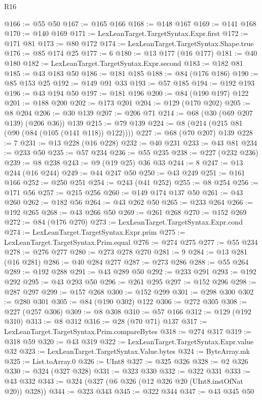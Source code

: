 \begin{lexlean}{R16}
\begin{coremodule}
@166 := @55 @50
@167 := @165 @166
@168 := @148 @167
@169 := @141 @168
@170 := @140 @169
@171 := LexLeanTarget.TargetSyntax.Expr.first
@172 := @171 @81
@173 := @80 @172
@174 := LexLeanTarget.TargetSyntax.Shape.true
@176 := @85 @174 @25
@177 := 6
@180 := @13 @177 (@16 @177)
@181 := @40 @180
@182 := LexLeanTarget.TargetSyntax.Expr.second
@183 := @182 @81
@185 := @43 @183 @50
@186 := @181 @185
@188 := @84 (@176 @186)
@190 := @85 @153 @25
@192 := @149 @91 @33
@193 := @57 @185
@194 := @192 @193
@196 := @43 @194 @50
@197 := @181 @196
@200 := @84 (@190 @197) @122
@201 := @188 @200
@202 := @173 @201
@204 := @129 (@170 @202)
@205 := @8 @204
@206 := @30 @139
@207 := @206 @71
@214 := @68 (@30 (@69 @207 @139) (@206 @36)) @139
@215 := @79 @139
@224 := @8 (@214 (@215 @81 (@90 (@84 (@105 (@141 @118)) @122))))
@227 := @68 (@70 @207) @139
@228 := 7
@231 := @13 @228 (@16 @228)
@232 := @40 @231
@233 := @43 @81
@234 := @233 @50
@235 := @57 @234
@236 := @55 @235
@238 := @227 (@232 @236)
@239 := @8 @238
@243 := @9 (@19 @25) @36 @33
@244 := 8
@247 := @13 @244 (@16 @244)
@249 := @44 @247 @50
@250 := @43 @249
@251 := @161 @166
@252 := @250 @251
@254 := @243 (@41 @252)
@255 := @8 @254
@256 := @171 @56
@257 := @215 @256
@260 := @149 @174 @137 @50
@261 := @43 @260
@262 := @182 @56
@264 := @43 @262 @50
@265 := @233 @264
@266 := @192 @265
@268 := @43 @266 @50
@269 := @261 @268
@270 := @152 @269
@272 := @84 (@176 @270)
@273 := LexLeanTarget.TargetSyntax.Expr.cond
@274 := LexLeanTarget.TargetSyntax.Expr.prim
@275 := LexLeanTarget.TargetSyntax.Prim.equal
@276 := @274 @275
@277 := @55 @234
@278 := @276 @277
@280 := @273 @278 @270
@281 := 9
@284 := @13 @281 (@16 @281)
@286 := @40 @284 @277
@287 := @273 @286
@288 := @55 @264
@289 := @192 @288
@291 := @43 @289 @50
@292 := @233 @291
@293 := @192 @292
@295 := @43 @293 @50
@296 := @261 @295
@297 := @152 @296
@298 := @287 @297
@299 := @157 @268
@300 := @152 @299
@301 := @298 @300
@302 := @280 @301
@305 := @84 (@190 @302) @122
@306 := @272 @305
@308 := @227 (@257 @306)
@309 := @8 @308
@310 := @57 @166
@312 := @129 (@192 @310)
@313 := @8 @312
@316 := @28 (@70 @71) @137
@317 := LexLeanTarget.TargetSyntax.Prim.compareBytes
@318 := @274 @317
@319 := @318 @59
@320 := @43 @319
@322 := LexLeanTarget.TargetSyntax.Expr.value @32
@323 := LexLeanTarget.TargetSyntax.Value.bytes
@324 := ByteArray.mk
@325 := List.toArray.{0}
@326 := UInt8
@327 := @325 @326
@328 := @2 @326
@330 := @324 (@327 @328)
@331 := @323 @330
@332 := @322 @331
@333 := @43 @332
@343 := @324 (@327 (@6 @326 (@12 @326 @20 (UInt8.instOfNat @20)) @328))
@344 := @323 @343
@345 := @322 @344
@347 := @43 @345 @50

\end{coremodule}
\end{lexlean}
